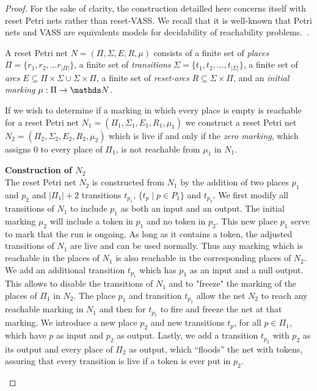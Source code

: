 \begin{proof}

For the sake of clarity, the construction detailled here concerns itself with reset Petri nets rather than reset-VASS. We recall that it is well-known that Petri nets and VASS are equivalents models for decidability of reachability problems.~\cite{DBLP:journals/siglog/Schmitz16}.

A reset Petri net $N = (\Pi, \Sigma, E, R, \mu)$ consists of a finite set of {\em places} $\Pi = \{r_1, r_2, ... r_{|\Pi|}\}$, a finite set of {\em transitions} $\Sigma = \{t_1, t_2, ..., t_{|\Sigma|} \}$, a finite set of {\em arcs} $E \subseteq \Pi \times \Sigma \cup \Sigma \times \Pi$, a finite set of
{\em reset-arcs} $R \subseteq \Sigma \times \Pi$, and an {\em initial marking} $\mu : \Pi \to \N$.


If we wish to determine if a marking in which every place is empty is reachable for a reset Petri net
 $N_1 = (\Pi_1, \Sigma_1, E_1, R_1, \mu_1)$ %
 we construct a reset Petri net
 $N_2 = (\Pi_2, \Sigma_2, E_2, R_2, \mu_2)$ %
  which is live if and only if the {\em zero marking}, which assigns $0$ to every place of $\Pi_1$, is not reachable from $\mu_1$ in $N_1$. \\

\begin{samepage}
{\bf Construction of $N_2$} \\
\indent
The reset Petri net $N_2$ is constructed from $N_1$ by the addition of two places $p_1$ and $p_2$ and $|\Pi_1| +2$ transitions $t_{p_1}$, $\{ t_p \mid p \in P_1 \}$ and $t_{p_2}$.
We first modify all transitions of $N_1$ to include $p_1$ as both an input and an output.
The initial marking $\mu_2$ will include a token in $p_1$ and no token in $p_2$. 
This new place $p_1$ serve to mark that the run is ongoing. As long as it contains a token, the adjusted transitions of $N_1$ are live and can be used normally. Thus any marking which is reachable in the places of $N_1$ is also reachable in the corresponding places of $N_2$.
We add an additional transition $t_{p_1}$ %
which has $p_1$ as an input and a null output.
This allows to disable the transitions of $N_1$ and to "freeze" the marking of the places of $\Pi_1$ in $N_2$.
 The place $p_1$ and transition $t_{p_1}$ allow the net $N_2$ to reach any reachable marking in $N_1$ and then for $t_{p_1}$ to fire and freeze the net at that marking.
We introduce a new place $p_2$ and new transitions $t_p$, for all $p \in \Pi_1$, which have $p$ as input and $p_2$ as output.
Lastly, we add a transition $t_{p_2}$ with $p_2$ as its output and every place of $\Pi_2$ as output, which ``floods'' the net with tokens, assuring that every transition is live if a token is ever
put in $p_2$.
\end{samepage}


\end{proof}
